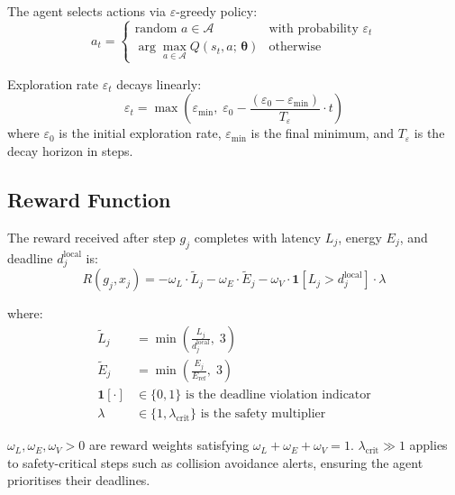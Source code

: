 \documentclass[12pt,a4paper]{article}
\theoremstyle{definition}
\theoremstyle{remark}
\begin{document}
The agent selects actions via $\varepsilon$-greedy policy:
\begin{equation}
  a_t =
  \begin{cases}
    \text{random } a \in \mathcal{A} & \text{with probability } \varepsilon_t \\
    \arg\max_{a \in \mathcal{A}} Q(s_t, a;\, \bm{\theta}) & \text{otherwise}
  \end{cases}
  \label{eq:epsilon_greedy}
\end{equation}

Exploration rate $\varepsilon_t$ decays linearly:
\begin{equation}
  \varepsilon_t = \max\!\left(
    \varepsilon_{\min},\;
    \varepsilon_0 - \frac{(\varepsilon_0 - \varepsilon_{\min})}{T_{\varepsilon}} \cdot t
  \right)
  \label{eq:epsilon_decay}
\end{equation}
where $\varepsilon_0$ is the initial exploration rate, $\varepsilon_{\min}$
is the final minimum, and $T_\varepsilon$ is the decay horizon in steps.

\subsection{Reward Function}

The reward received after step $g_j$ completes with latency $L_j$,
energy $E_j$, and deadline $d_j^{\text{local}}$ is:
\begin{equation}
  R(g_j, x_j) = -\omega_L \cdot \widetilde{L}_j
    - \omega_E \cdot \widetilde{E}_j
    - \omega_V \cdot \mathbf{1}[L_j > d_j^{\text{local}}] \cdot \lambda
  \label{eq:reward}
\end{equation}

where:
\begin{align}
  \widetilde{L}_j &= \min\!\left(\frac{L_j}{d_j^{\text{local}}},\; 3\right)
    \label{eq:norm_lat}\\
  \widetilde{E}_j &= \min\!\left(\frac{E_j}{E_{\text{ref}}},\; 3\right)
    \label{eq:norm_energy}\\
  \mathbf{1}[\cdot] &\in \{0, 1\} \text{ is the deadline violation indicator}
    \label{eq:indicator}\\
  \lambda &\in \{1, \lambda_{\text{crit}}\}
    \text{ is the safety multiplier}
    \label{eq:lambda}
\end{align}

$\omega_L, \omega_E, \omega_V > 0$ are reward weights satisfying
$\omega_L + \omega_E + \omega_V = 1$.
$\lambda_{\text{crit}} \gg 1$ applies to safety-critical steps such as
collision avoidance alerts, ensuring the agent prioritises their deadlines.
\end{document}
